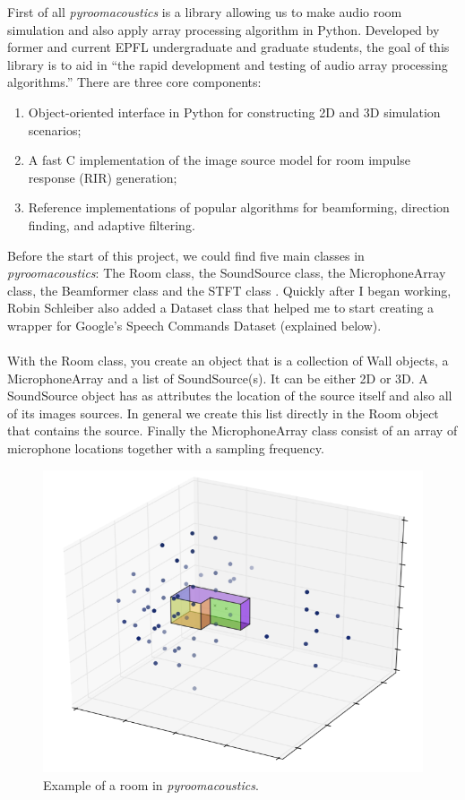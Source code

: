 \documentclass[11pt,a4paper,titlepage]{report}
\providecommand{\tightlist}{%
	\setlength{\itemsep}{0pt}\setlength{\parskip}{0pt}}
\begin{document}
\hspace*{0.6cm}
First of all \textit{pyroomacoustics} is a library allowing us to make audio room simulation  and also apply array processing algorithm in Python. Developed by former and current EPFL undergraduate and graduate students, the goal of this library is to aid in ``the rapid development and testing of audio array processing algorithms.'' There are three core components:
\begin{enumerate}
	\tightlist
	\item Object-oriented interface in Python for constructing 2D and 3D simulation scenarios;
	\item A fast C implementation of the image source model for room impulse response (RIR) generation;
	\item Reference implementations of popular algorithms for beamforming, direction finding, and adaptive filtering.
\end{enumerate} 
\hspace*{0.6cm} 
Before the start of this project, we could find five main classes in \textit{pyroomacoustics}: The Room class, the SoundSource class, the MicrophoneArray class, the Beamformer class and the STFT class . Quickly after I began working, Robin Schleiber also added a Dataset class that helped me to start creating a wrapper for Google's Speech Commands Dataset (explained below).\\
\\
\hspace{0.6cm}
With the Room class, you create an object that is a collection of Wall objects, a MicrophoneArray and a list of SoundSource(s). It can be either 2D or 3D.
A SoundSource object has as attributes the location of the source itself and also all of its images sources. In general we create this list directly in the Room object that contains the source.
Finally the MicrophoneArray class consist of an array of microphone locations together with a sampling frequency.
\begin{figure}[h!]
	\centering
	\includegraphics[width=0.7\linewidth]{rapport1}
	\caption[Example of a room in \emph{pyroomacoustics}]{Example of a room in \emph{pyroomacoustics}.}
\end{figure}
\end{document}
